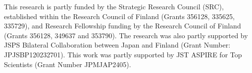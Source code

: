 \documentclass[sigconf]{acmart}
\begin{document}

\begin{acks}
This research is partly funded by the Strategic Research Council (SRC), established within the Research Council of Finland (Grants 356128, 335625, 335729), and Research Fellowship funding by the Research Council of Finland (Grants 356128, 349637 and 353790). The research was also partly supported by JSPS Bilateral Collaboration between Japan and Finland (Grant Number: JPJSBP120232701). 
This work was partly supported by JST ASPIRE for Top Scientists (Grant Number JPMJAP2405).
\end{acks}




\newpage


\end{document}
